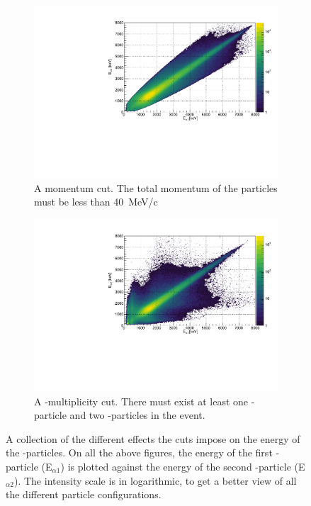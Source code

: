\begin{figure}[H]
\begin{subfigure}[t]{0.5\linewidth}
		\includegraphics[width=\linewidth]{../figures/EEMomentumCut.pdf}
		\caption{A momentum cut. The total momentum of the particles must be less than \SI{40}{MeV/c}}
		\label{fig:EEMomentumCut}
	\end{subfigure}
	\begin{subfigure}[t]{0.5\linewidth}
		\includegraphics[width=\linewidth]{../figures/EEBetaMulCut.pdf}
		\caption{A \be-multiplicity cut. There must exist at least one \be-particle and two \al-particles in the event. }
		\label{fig:EEBetaMulCut}
	\end{subfigure}
	\caption{A collection of the different effects the cuts impose on the energy of the \al-particles. On all the above figures, the energy of the first \al-particle (E$_{\alpha1}$) is plotted against the energy of the second \al-particle (E$_{\alpha2}$). The intensity scale is in logarithmic, to get a better view of all the different particle configurations.}
\end{figure}

